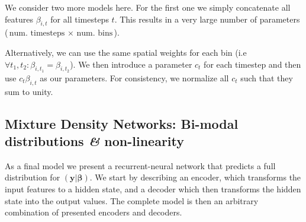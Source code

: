 \documentclass[nobib, a4paper]{tufte-handout}
\begin{document}
We consider two more models here.
For the first one we simply concatenate all features \(\beta_{i, t}\) for all timesteps \(t\).
This results in a very large number of parameters (\(\text{num. timesteps } \times \text{ num. bins}\)).

Alternatively, we can use the same spatial weights for each bin (i.e\ \( \forall t_1, t_2: \beta_{i, t_1} = \beta_{i, t_2}\)).
We then introduce a parameter \(c_t\) for each timestep and then use $c_t \beta_{i,t}$ as our parameters.
For consistency, we normalize all \(c_t\) such that they sum to unity.

\subsection{Mixture Density Networks: Bi-modal distributions \textit{\&} non-linearity}
As a final model we present a recurrent-neural network that predicts a full distribution for \(\left( \bm{y} | \bm{\beta} \right)\).
We start by describing an encoder, which transforms the input features to a hidden state, and a decoder which then transforms the hidden state into the output values.
The complete model is then an arbitrary combination of presented encoders and decoders.
\end{document}
